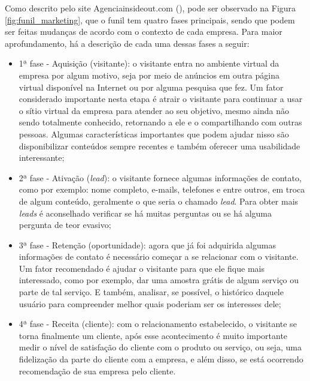 Como descrito pelo site Agenciainsideout.com (\citeyear{INSIDEOUT:2018}), pode ser observado na Figura \ref{fig:funil_marketing}, que o funil tem quatro fases principais, sendo que podem ser feitas mudanças de acordo com o contexto de cada empresa. Para maior aprofundamento, há a descrição de cada uma dessas fases a seguir:

\begin{itemize}
    \item 1ª fase - Aquisição (visitante): o visitante entra no ambiente virtual da empresa por algum motivo, seja por meio de anúncios em outra página virtual disponível na Internet ou por alguma pesquisa que fez. Um fator considerado importante nesta etapa é atrair o visitante para continuar a usar o sítio virtual da empresa para atender ao seu objetivo, mesmo ainda não sendo totalmente conhecido, retornando a ele e o compartilhando com outras pessoas. Algumas características importantes que podem ajudar nisso são disponibilizar conteúdos sempre recentes e também oferecer uma usabilidade interessante;
    
    \item 2ª fase - Ativação (\textit{lead}): o visitante fornece algumas informações de contato, como por exemplo: nome completo, e-mails, telefones e entre outros, em troca de algum conteúdo, geralmente o que seria o chamado \textit{lead}. Para obter mais \textit{leads} é aconselhado verificar se há muitas perguntas ou se há alguma pergunta de teor evasivo;
    
    \item 3ª fase - Retenção (oportunidade): agora que já foi adquirida algumas informações de contato é necessário começar a se relacionar com o visitante. Um fator recomendado é ajudar o visitante para que ele fique mais interessado, como por exemplo, dar uma amostra grátis de algum serviço ou parte de tal serviço. E também, analisar, se possível, o histórico daquele usuário para compreender melhor quais poderiam ser os interesses dele;
    
    \item 4ª fase - Receita (cliente): com o relacionamento estabelecido, o visitante se torna finalmente um cliente, após esse acontecimento é muito importante medir o nível de satisfação do cliente com o produto ou serviço, ou seja, uma fidelização da parte do cliente com a empresa, e além disso, se está ocorrendo recomendação de sua empresa pelo cliente.

\end{itemize}

